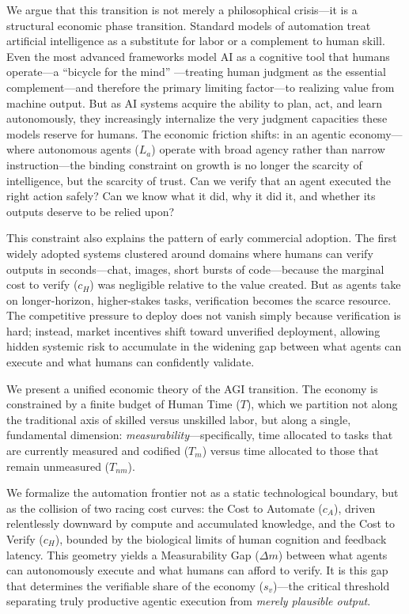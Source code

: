\documentclass[12pt, letter]{article}
\begin{document}
We argue that this transition is not merely a philosophical crisis—it is a structural economic phase transition. Standard models of automation treat artificial intelligence as a substitute for labor or a complement to human skill. Even the most advanced frameworks model AI as a cognitive tool that humans operate—a ``bicycle for the mind'' \citep{AgrawalGansGoldfarbBicycles}—treating human judgment as the essential complement---and therefore the primary limiting factor---to realizing value from machine output. But as AI systems acquire the ability to plan, act, and learn autonomously, they increasingly internalize the very judgment capacities these models reserve for humans. The economic friction shifts: in an agentic economy—where autonomous agents ($L_a$) operate with broad agency rather than narrow instruction—the binding constraint on growth is no longer the scarcity of intelligence, but the scarcity of trust. Can we verify that an agent executed the right action safely? Can we know what it did, why it did it, and whether its outputs deserve to be relied upon?

This constraint also explains the pattern of early commercial adoption. The first widely adopted systems clustered around domains where humans can verify outputs in seconds—chat, images, short bursts of code—because the marginal cost to verify ($c_H$) was negligible relative to the value created. But as agents take on longer-horizon, higher-stakes tasks, verification becomes the scarce resource. The competitive pressure to deploy does not vanish simply because verification is hard; instead, market incentives shift toward unverified deployment, allowing hidden systemic risk to accumulate in the widening gap between what agents can execute and what humans can confidently validate.

We present a unified economic theory of the AGI transition. The economy is constrained by a finite budget of Human Time ($T$), which we partition not along the traditional axis of skilled versus unskilled labor, but along a single, fundamental dimension: \emph{measurability}—specifically, time allocated to tasks that are currently measured and codified ($T_m$) versus time allocated to those that remain unmeasured ($T_{nm}$).

We formalize the automation frontier not as a static technological boundary, but as the collision of two racing cost curves: the Cost to Automate ($c_A$), driven relentlessly downward by compute and accumulated knowledge, and the Cost to Verify ($c_H$), bounded by the biological limits of human cognition and feedback latency.  This geometry yields a Measurability Gap ($\Delta m$) between what agents can autonomously execute and what humans can afford to verify. It is this gap that determines the verifiable share of the economy ($s_v$)—the critical threshold separating truly productive agentic execution from \emph{merely plausible output}.
\end{document}
